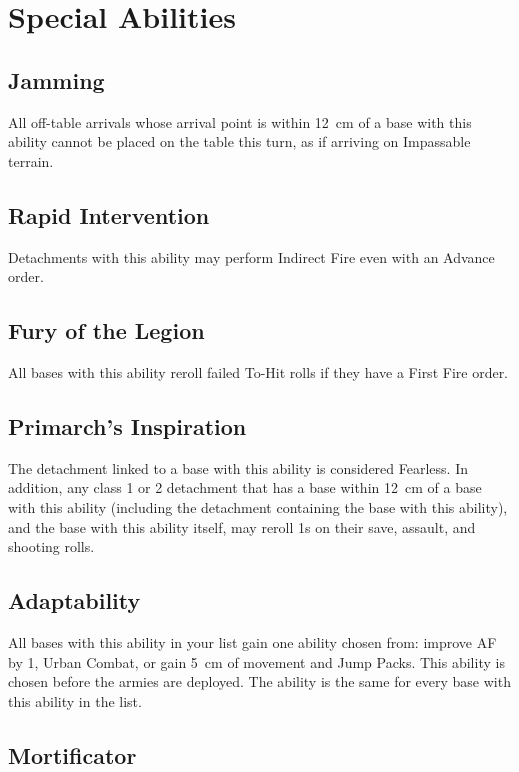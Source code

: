 \section{Special Abilities}

\subsection{Jamming}

All off-table arrivals whose arrival point is within 12~cm of a base with this ability cannot be placed on the table this turn, as if arriving on Impassable terrain.

\subsection{Rapid Intervention}

Detachments with this ability may perform Indirect Fire even with an Advance order.

\subsection{Fury of the Legion}

All bases with this ability reroll failed To-Hit rolls if they have a First Fire order.

\subsection{Primarch's Inspiration}

The detachment linked to a base with this ability is considered Fearless. In addition, any class 1 or 2 detachment that has a base within 12~cm of a base with this ability (including the detachment containing the base with this ability), and the base with this ability itself, may reroll 1s on their save, assault, and shooting rolls.

\subsection{Adaptability}

All bases with this ability in your list gain one ability chosen from: improve AF by 1, Urban Combat, or gain 5~cm of movement and Jump Packs. This ability is chosen before the armies are deployed. The ability is the same for every base with this ability in the list.

\subsection{Mortificator}

